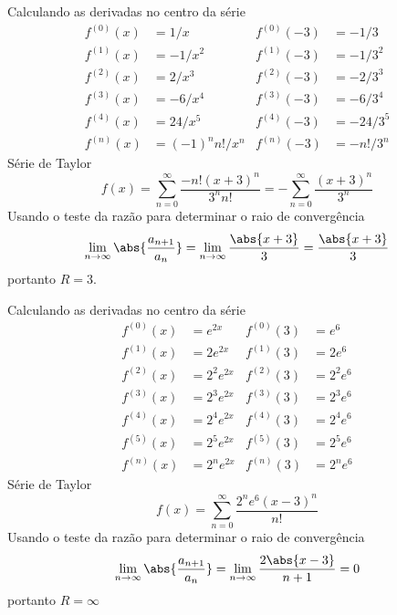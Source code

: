 \begin{exercises}
\begin{exercise}
\begin{answer}
\begin{alphalist}
  \item Calculando as derivadas no centro da série
  \begin{align*}
  	f^{(0)}(x) & =  1/x            & f^{(0)}(-3) & =  -1/3     \\
  	f^{(1)}(x) & = -1/x^2          & f^{(1)}(-3) & =  -1/3^2   \\
  	f^{(2)}(x) & =  2/x^3          & f^{(2)}(-3) & =  -2/3^3   \\
  	f^{(3)}(x) & = -6/x^4          & f^{(3)}(-3) & =  -6/3^4   \\
  	f^{(4)}(x) & = 24/x^5          & f^{(4)}(-3) & = -24/3^5   \\
  	f^{(n)}(x) & = (-1)^n n! / x^n & f^{(n)}(-3) & = -n! / 3^n
  \end{align*}
  Série de Taylor
  \[
    f(x) =  \sum_{n=0}^\infty \frac{-n!(x+3)^n}{3^n n!}
         = -\sum_{n=0}^\infty \frac{(x+3)^n}{3^n}
  \]
  Usando o teste da razão para determinar o raio de convergência
  \[
    \lim_{n\to\infty}\abs{\frac{a_{n+1}}{a_n}} =
    \lim_{n\to\infty}\frac{\abs{x+3}}{3} =
    \frac{\abs{x+3}}{3}
  \]
  portanto $R=3$.

  \item Calculando as derivadas no centro da série
  \begin{align*}
  	f^{(0)}(x) & =     e^{2x} & f^{(0)}(3) & =     e^{6} \\
  	f^{(1)}(x) & = 2   e^{2x} & f^{(1)}(3) & = 2   e^{6} \\
  	f^{(2)}(x) & = 2^2 e^{2x} & f^{(2)}(3) & = 2^2 e^{6} \\
  	f^{(3)}(x) & = 2^3 e^{2x} & f^{(3)}(3) & = 2^3 e^{6} \\
  	f^{(4)}(x) & = 2^4 e^{2x} & f^{(4)}(3) & = 2^4 e^{6} \\
  	f^{(5)}(x) & = 2^5 e^{2x} & f^{(5)}(3) & = 2^5 e^{6} \\
  	f^{(n)}(x) & = 2^n e^{2x} & f^{(n)}(3) & = 2^n e^{6}
  \end{align*}
  Série de Taylor
  \[
    f(x) = \sum_{n=0}^\infty \frac{2^n e^6 (x-3)^n}{n!}
  \]
  Usando o teste da razão para determinar o raio de convergência
  \[
    \lim_{n\to\infty}\abs{\frac{a_{n+1}}{a_n}} =
    \lim_{n\to\infty}\frac{2\abs{x-3}}{n+1} = 0
  \]
  portanto $R=\infty$


\end{alphalist}
\end{answer}
\end{exercise}
\end{exercises}
